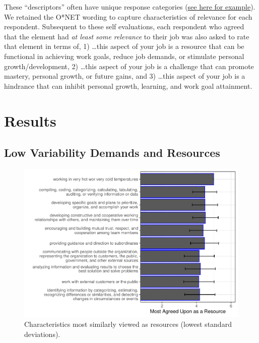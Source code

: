 \documentclass[
  english,
  man]{apa6}
\begin{document}
These ``descriptors'' often have unique response categories (\href{https://www.ONETonline.org/find/descriptor/result/4.C.1.c.2}{see here for example}). We retained the O*NET wording to capture characteristics of relevance for each respondent. Subsequent to these self evaluations, each respondent who agreed that the element had \emph{at least some relevance} to their job was also asked to rate that element in terms of, 1) \ldots this aspect of your job is a resource that can be functional in achieving work goals, reduce job demands, or stimulate personal growth/development, 2) \ldots this aspect of your job is a challenge that can promote mastery, personal growth, or future gains, and 3) \ldots this aspect of your job is a hindrance that can inhibit personal growth, learning, and work goal attainment.

\hypertarget{results}{%
\section{Results}\label{results}}

\hypertarget{low-variability-demands-and-resources}{%
\subsection{Low Variability Demands and Resources}\label{low-variability-demands-and-resources}}

\begin{figure}
\centering
\includegraphics{Submission_files/figure-latex/resourcesagree-1.pdf}
\caption{\label{fig:resourcesagree}Characteristics most similarly viewed as resources (lowest standard deviations).}
\end{figure}
\end{document}
